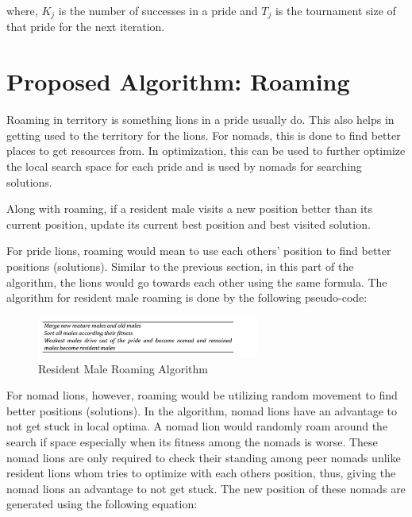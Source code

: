 where, $K_j$ is the number of successes in a pride and $T_j$ is the tournament size of that pride for the next iteration.

\section{Proposed Algorithm: Roaming}
\par Roaming in territory is something lions in a pride usually do. This also helps in getting used to the territory for the lions. For nomads, this is done to find better places to get resources from. In optimization, this can be used to further optimize the local search space for each pride and is used by nomads for searching solutions.

\par Along with roaming, if a resident male visits a new position better than its current position, update its current best position and best visited solution.

\par For pride lions, roaming would mean to use each others' position to find better positions (solutions). Similar to the previous section, in this part of the algorithm, the lions would go towards each other using the same formula. The algorithm for resident male roaming is done by the following pseudo-code:

\begin{figure}[h]
\begin{center}
\includegraphics[width=0.65\textwidth]{img/roam/resident}
\caption{Resident Male Roaming Algorithm}
\end{center}
\end{figure}

\par For nomad lions, however, roaming would be utilizing random movement to find better positions (solutions). In the algorithm, nomad lions have an advantage to not get stuck in local optima. A nomad lion would randomly roam around the search if space especially when its fitness among the nomads is worse. These nomad lions are only required to check their standing among peer nomads unlike resident lions whom tries to optimize with each others position, thus, giving the nomad lions an advantage to not get stuck. The new position of these nomads are generated using the following equation:

